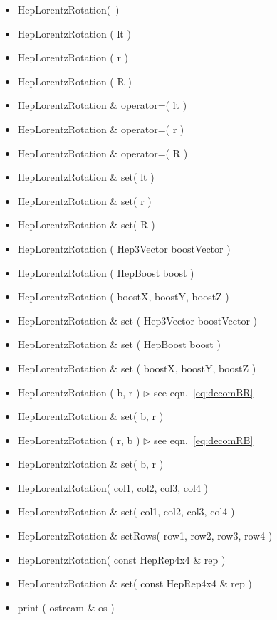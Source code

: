 \documentclass[twoside,12pt]{article}
\newcommand {\see}[1] {\hfill$\triangleright$ see eqn.~#1}
\newenvironment{shortlist}{%
\begin{itemize}
\setlength{\itemsep}{0pt}
\setlength{\parskip}{0pt}
}{%
\end{itemize}
}
\begin{document}
\begin{shortlist}
  \item HepLorentzRotation(~)

  \item HepLorentzRotation ( lt )
  \item HepLorentzRotation ( r )
  \item HepLorentzRotation ( R )
  \item HepLorentzRotation \& operator=( lt )
  \item HepLorentzRotation \& operator=( r )
  \item HepLorentzRotation \& operator=( R )
  \item HepLorentzRotation \& set( lt )
  \item HepLorentzRotation \& set( r )
  \item HepLorentzRotation \& set( R )


  \item HepLorentzRotation ( Hep3Vector boostVector )
  \item HepLorentzRotation ( HepBoost   boost )
  \item HepLorentzRotation ( boostX, boostY, boostZ )
  \item HepLorentzRotation \& set ( Hep3Vector boostVector )
  \item HepLorentzRotation \& set ( HepBoost   boost )
  \item HepLorentzRotation \& set ( boostX, boostY, boostZ )

  \item HepLorentzRotation ( b, r )			\see{\ref{eq:decomBR}}
  \item HepLorentzRotation \& set( b, r )		
  \item HepLorentzRotation ( r, b )			\see{\ref{eq:decomRB}}
  \item HepLorentzRotation \& set( b, r )		

  \item HepLorentzRotation( col1, col2, col3, col4 )  
  \item HepLorentzRotation \& set( col1, col2, col3, col4 )  
  \item HepLorentzRotation \& setRows( row1, row2, row3, row4 )  

  \item HepLorentzRotation( const HepRep4x4 \& rep )
  \item HepLorentzRotation \& set( const HepRep4x4 \& rep )

 \item print ( ostream \& os ) 

\end{shortlist}
\end{document}
